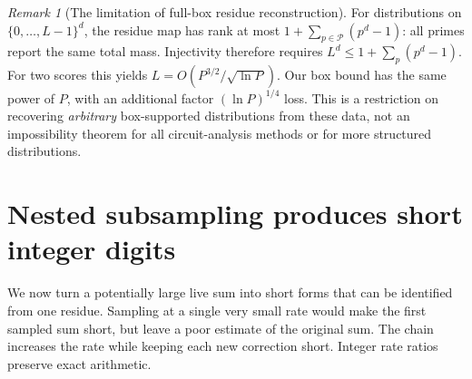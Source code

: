 \documentclass[11pt,letterpaper]{article}
\theoremstyle{definition}
\theoremstyle{remark}
\newtheorem{remark}[theorem]{Remark}
\newcommand{\cP}{\mathcal P}
\begin{document}
\begin{remark}[The limitation of full-box residue reconstruction]\label{rem:rank}
For distributions on \(\{0,\ldots,L-1\}^d\), the residue map has
rank at most \(1+\sum_{p\in\cP}(p^d-1)\): all primes report the
same total mass. Injectivity therefore requires
\(L^d\le1+\sum_p(p^d-1)\).
For two scores this yields
\(L=O(P^{3/2}/\sqrt{\ln P})\). Our box bound has the same power
of \(P\), with an additional factor \((\ln P)^{1/4}\) loss.
This is a restriction on recovering \emph{arbitrary} box-supported
distributions from these data, not an impossibility theorem for all
circuit-analysis methods or for more structured distributions.
\end{remark}

\section{Nested subsampling produces short integer digits}\label{sec:chains}

We now turn a potentially large live sum into short forms that can
be identified from one residue. Sampling at a single very small rate
would make the first sampled sum short, but leave a poor estimate of
the original sum. The chain increases the rate while keeping each
new correction short. Integer rate ratios preserve exact arithmetic.
\end{document}
